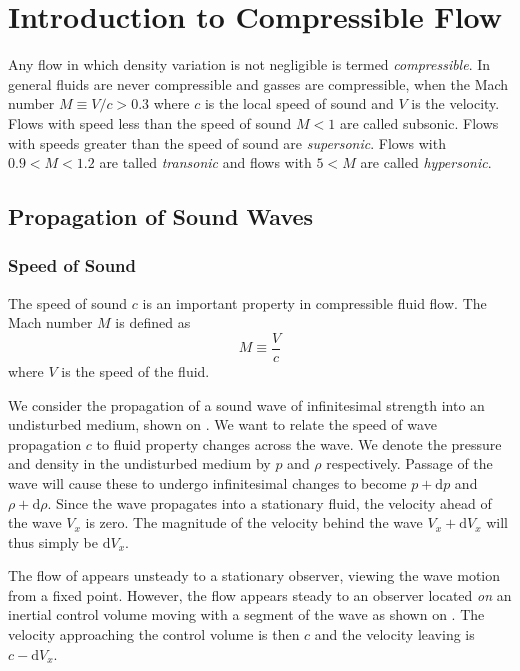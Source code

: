 
\section{Introduction to Compressible Flow}
Any flow in which density variation is not negligible is termed \textit{compressible}.
In general fluids are never compressible and gasses are compressible, when the Mach number $M \equiv V / c > \num{0,3}$ where $c$ is the local speed of sound and $V$ is the velocity.
Flows with speed less than the speed of sound $M < 1$ are called subsonic.
Flows with speeds greater than the speed of sound are \textit{supersonic}.
Flows with $\num{0,9} < M < \num{1,2}$ are talled \textit{transonic} and flows with $5<M$ are called \textit{hypersonic}.

\subsection{Propagation of Sound Waves}

\subsubsection{Speed of Sound}
The speed of sound $c$ is an important property in compressible fluid flow.
The Mach number $M$ is defined as
\begin{equation*}
  M \equiv \frac{V}{c}
\end{equation*}
where $V$ is the speed of the fluid.

We consider the propagation of a sound wave of infinitesimal strength into an undisturbed medium, shown on .
We want to relate the speed of wave propagation $c$ to fluid property changes across the wave.
We denote the pressure and density in the undisturbed medium by $p$ and $\rho$ respectively.
Passage of the wave will cause these to undergo infinitesimal changes to become $p + \mathrm{d}p$ and $\rho + \mathrm{d}\rho$. 
Since the wave propagates into a stationary fluid, the velocity ahead of the wave $V_x$ is zero.
The magnitude of the velocity behind the wave $V_x + \mathrm{d}V_x$ will thus simply be $\mathrm{d}V_x$.

The flow of  appears unsteady to a stationary observer, viewing the wave motion from a fixed point.
However, the flow appears steady to an observer located \textit{on} an inertial control volume moving with a segment of the wave as shown on .
The velocity approaching the control volume is then $c$ and the velocity leaving is $c - \mathrm{d}V_x$.


